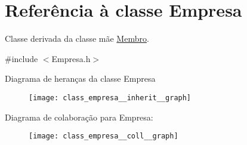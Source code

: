 \hypertarget{class_empresa}{\section{Referência à classe Empresa}
\label{class_empresa}
}


Classe derivada da classe mãe \hyperlink{class_membro}{Membro}.  




{\ttfamily \#include $<$Empresa.\+h$>$}



Diagrama de heranças da classe Empresa\nopagebreak
\begin{figure}[H]
\begin{center}
\leavevmode
\texttt{[image: class\_empresa\_\_inherit\_\_graph]}
\end{center}
\end{figure}


Diagrama de colaboração para Empresa\+:\nopagebreak
\begin{figure}[H]
\begin{center}
\leavevmode
\texttt{[image: class\_empresa\_\_coll\_\_graph]}
\end{center}
\end{figure}
